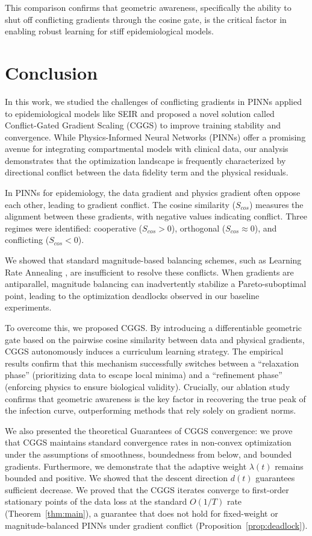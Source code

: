 \documentclass[11pt]{article}
\begin{document}
This comparison confirms that geometric awareness, specifically the ability to shut off conflicting gradients through the cosine gate, is the critical factor in enabling robust learning for stiff epidemiological models.


\section{Conclusion}

In this work, we studied the challenges of conflicting gradients in PINNs applied to epidemiological models like SEIR and proposed a novel solution called Conflict-Gated Gradient Scaling (CGGS) to improve training stability and convergence.  While Physics-Informed Neural Networks (PINNs) offer a promising avenue for integrating compartmental models with clinical data, our analysis demonstrates that the optimization landscape is frequently characterized by directional conflict between the data fidelity term and the physical residuals.

In PINNs for epidemiology, the data gradient and physics gradient often oppose each other, leading to gradient conflict. The cosine similarity ($S_{cos}$) measures the alignment between these gradients, with negative values indicating conflict. Three regimes were identified: cooperative ($S_{cos} > 0$), orthogonal ($S_{cos} \approx 0$), and conflicting ($S_{cos} < 0$).

We showed that standard magnitude-based balancing schemes, such as Learning Rate Annealing \cite{wang2021understanding}, are insufficient to resolve these conflicts. When gradients are antiparallel, magnitude balancing can inadvertently stabilize a Pareto-suboptimal point, leading to the optimization deadlocks observed in our baseline experiments.

To overcome this, we proposed CGGS. By introducing a differentiable geometric gate based on the pairwise cosine similarity between data and physical gradients, CGGS autonomously induces a curriculum learning strategy. The empirical results confirm that this mechanism successfully switches between a ``relaxation phase'' (prioritizing data to escape local minima) and a ``refinement phase'' (enforcing physics to ensure biological validity). Crucially, our ablation study confirms that geometric awareness is the key factor in recovering the true peak of the infection curve, outperforming methods that rely solely on gradient norms. 

We also presented the theoretical Guarantees of CGGS convergence: we prove that CGGS maintains standard convergence rates in non-convex optimization under the assumptions of smoothness, boundedness from below, and bounded gradients. Furthermore, we demonstrate that the adaptive weight $\lambda(t)$ remains bounded and positive. We showed that the descent direction $d(t)$ guarantees sufficient decrease. We proved that the CGGS iterates converge to first-order stationary points of the data loss at the standard $O(1/T)$ rate (Theorem~\ref{thm:main}), a guarantee that does not hold for fixed-weight or magnitude-balanced PINNs under gradient conflict (Proposition~\ref{prop:deadlock}).
\end{document}
